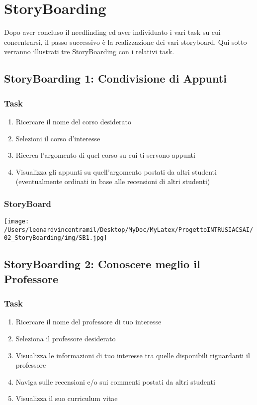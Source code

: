 \chapter{StoryBoarding}

Dopo aver concluso il needfinding ed aver individuato i vari task su cui concentrarsi, 
il passo successivo è la realizzazione dei vari storyboard. 
Qui sotto verranno illustrati tre StoryBoarding con i relativi task.

\section{StoryBoarding 1: Condivisione di Appunti}

\subsection{Task}
\begin{enumerate}
    \item Ricercare il nome del corso desiderato
    \item Selezioni il corso d’interesse
    \item Ricerca l’argomento di quel corso su cui ti servono appunti
    \item Visualizza gli appunti su quell’argomento postati da altri studenti (eventualmente ordinati in base alle recensioni di altri studenti)  
\end{enumerate}

\subsection{StoryBoard}
\begin{center}
    \texttt{[image: /Users/leonardvincentramil/Desktop/MyDoc/MyLatex/ProgettoINTRUSIACSAI/02\_StoryBoarding/img/SB1.jpg]}
\end{center}

\section{StoryBoarding 2: Conoscere meglio il Professore}

\subsection{Task}
\begin{enumerate}
    \item Ricercare il nome del professore di tuo interesse
    \item Seleziona il professore desiderato
    \item Visualizza le informazioni di tuo interesse tra quelle disponibili riguardanti il professore
    \item Naviga sulle recensioni e/o sui commenti postati da altri studenti 
    \item Visualizza il suo curriculum vitae 
\end{enumerate}

